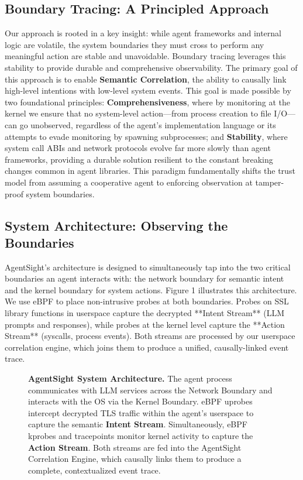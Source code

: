 \subsection{Boundary Tracing: A Principled Approach}
Our approach is rooted in a key insight: while agent frameworks and internal logic are volatile, the system boundaries they must cross to perform any meaningful action are stable and unavoidable. Boundary tracing leverages this stability to provide durable and comprehensive observability. The primary goal of this approach is to enable \textbf{Semantic Correlation}, the ability to causally link high-level intentions with low-level system events. This goal is made possible by two foundational principles: \textbf{Comprehensiveness}, where by monitoring at the kernel we ensure that no system-level action—from process creation to file I/O—can go unobserved, regardless of the agent's implementation language or its attempts to evade monitoring by spawning subprocesses; and \textbf{Stability}, where system call ABIs and network protocols evolve far more slowly than agent frameworks, providing a durable solution resilient to the constant breaking changes common in agent libraries. This paradigm fundamentally shifts the trust model from assuming a cooperative agent to enforcing observation at tamper-proof system boundaries.

\subsection{System Architecture: Observing the Boundaries}
AgentSight's architecture is designed to simultaneously tap into the two critical boundaries an agent interacts with: the network boundary for semantic intent and the kernel boundary for system actions. Figure 1 illustrates this architecture. We use eBPF to place non-intrusive probes at both boundaries. Probes on SSL library functions in userspace capture the decrypted **Intent Stream** (LLM prompts and responses), while probes at the kernel level capture the **Action Stream** (syscalls, process events). Both streams are processed by our userspace correlation engine, which joins them to produce a unified, causally-linked event trace.

\begin{figure}[h!]
    \centering
    \caption{\textbf{AgentSight System Architecture.} The agent process communicates with LLM services across the Network Boundary and interacts with the OS via the Kernel Boundary. eBPF uprobes intercept decrypted TLS traffic within the agent's userspace to capture the semantic \textbf{Intent Stream}. Simultaneously, eBPF kprobes and tracepoints monitor kernel activity to capture the \textbf{Action Stream}. Both streams are fed into the AgentSight Correlation Engine, which causally links them to produce a complete, contextualized event trace.}
    \label{fig:architecture}
\end{figure}

